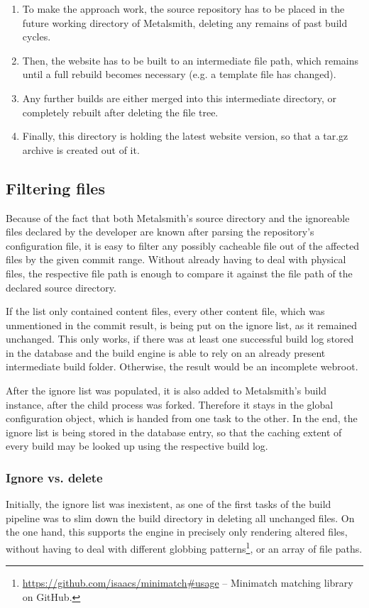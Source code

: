 \begin{enumerate}
  \item To make the approach work, the source repository has to be placed in the future working directory of Metalsmith, deleting any remains of past build cycles.
  \item Then, the website has to be built to an intermediate file path, which remains until a full rebuild becomes necessary (e.g. a template file has changed).
  \item Any further builds are either merged into this intermediate directory, or completely rebuilt after deleting the file tree.
  \item Finally, this directory is holding the latest website version, so that a tar.gz archive is created out of it.
\end{enumerate}

\subsection{Filtering files}
Because of the fact that both Metalsmith's source directory and the ignoreable files declared by the developer are known after parsing the repository's configuration file, it is easy to filter any possibly cacheable file out of the affected files by the given commit range. Without already having to deal with physical files, the respective file path is enough to compare it against the file path of the declared source directory.

If the list only contained content files, every other content file, which was unmentioned in the commit result, is being put on the ignore list, as it remained unchanged. This only works, if there was at least one successful build log stored in the database and the build engine is able to rely on an already present intermediate build folder. Otherwise, the result would be an incomplete webroot.

After the ignore list was populated, it is also added to Metalsmith's build instance, after the child process was forked. Therefore it stays in the global configuration object, which is handed from one task to the other. In the end, the ignore list is being stored in the database entry, so that the caching extent of every build may be looked up using the respective build log.

\subsubsection{Ignore vs. delete}
Initially, the ignore list was inexistent, as one of the first tasks of the build pipeline was to slim down the build directory in deleting all unchanged files. On the one hand, this supports the engine in precisely only rendering altered files, without having to deal with different globbing patterns\footnote{\url{https://github.com/isaacs/minimatch\#usage} -- Minimatch matching library on GitHub.}, or an array of file paths.

